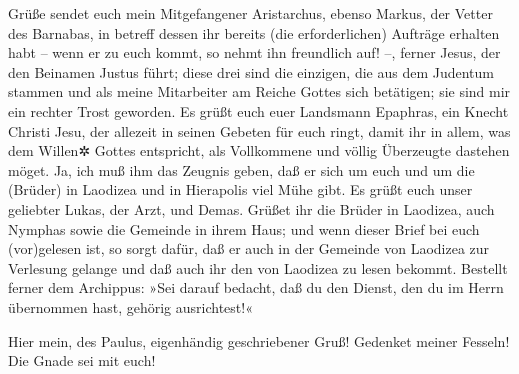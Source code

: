  Grüße sendet euch mein Mitgefangener Aristarchus, ebenso
Markus, der Vetter des Barnabas, in betreff dessen ihr bereits (die
erforderlichen) Aufträge erhalten habt -- wenn er zu euch kommt, so
nehmt ihn freundlich auf! --,  ferner Jesus, der den
Beinamen Justus führt; diese drei sind die einzigen, die aus dem
Judentum stammen und als meine Mitarbeiter am Reiche Gottes sich
betätigen; sie sind mir ein rechter Trost geworden.  Es
grüßt euch euer Landsmann Epaphras, ein Knecht Christi Jesu, der
allezeit in seinen Gebeten für euch ringt, damit ihr in allem, was dem
Willen✲ Gottes entspricht, als Vollkommene und völlig Überzeugte
dastehen möget.  Ja, ich muß ihm das Zeugnis geben, daß
er sich um euch und um die (Brüder) in Laodizea und in Hierapolis viel
Mühe gibt.  Es grüßt euch unser geliebter Lukas, der
Arzt, und Demas.  Grüßet ihr die Brüder in Laodizea, auch
Nymphas sowie die Gemeinde in ihrem Haus;  und wenn
dieser Brief bei euch (vor)gelesen ist, so sorgt dafür, daß er auch in
der Gemeinde von Laodizea zur Verlesung gelange und daß auch ihr den von
Laodizea zu lesen bekommt.  Bestellt ferner dem
Archippus: »Sei darauf bedacht, daß du den Dienst, den du im Herrn
übernommen hast, gehörig ausrichtest!«

 Hier mein, des Paulus, eigenhändig geschriebener Gruß!
Gedenket meiner Fesseln! Die Gnade sei mit euch!
